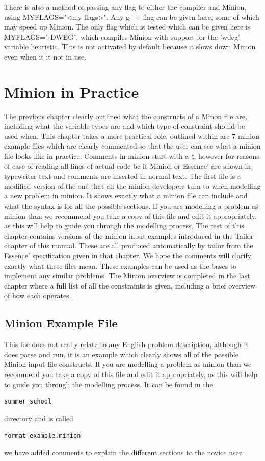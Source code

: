 \documentclass[oneside]{book}
\begin{document}
There is also a method of passing any flag to either the compiler and Minion, using MYFLAGS="<my flags>". Any g++ flag can be given here, some of which may speed up Minion. The only flag which is tested which can be given here is MYFLAGS="-DWEG", which compiles Minion with support for the 'wdeg' variable heuristic. This is not activated by default because it slows down Minion even when it it not in use.





\chapter{Minion in Practice}
The previous chapter clearly outlined what the constructs of a Minon file are, including what the variable types are and which type of constraint should be used when. This chapter takes a more practical role, outlined within are 7 minion example files which are clearly commented so that the user can see what a minion file looks like in practice. Comments in minion start with a $\sharp$, however for reasons of ease of reading all lines of actual code be it Minion or Essence' are shown in typewriter text and comments are inserted in normal text. The first file is a modified version of the one that all the minion developers turn to when modelling a new problem in minion. It shows exactly what a minion file can include and what the syntax is for all the possible sections. If you are modelling a problem as minion than we recommend you take a copy of this file and edit it appropriately, as this will help to guide you through the modelling process. The rest of this chapter contains versions  of the minion input examples introduced in the Tailor chapter of this manual. These are all produced automatically by tailor from the Essence' specification given in that chapter. We hope the comments will clarify exactly what these files mean. These examples can be used as the bases to implement any similar problems. The Minion overview is completed in the last chapter where a full list of all the constraints is given, including a brief overview of how each operates. 

\section{Minion Example File}
This file does not really relate to any English problem description, although it does parse and run,  it is an example which clearly shows all of the possible Minion input file constructs. If you are modelling a problem as minion than we recommend you take a copy of this file and edit it appropriately, as this will help to guide you through the modelling process. It can be found in the \begin{verbatim}summer_school\end{verbatim} directory and is called \begin{verbatim}format_example.minion\end{verbatim} we have added comments  to explain the different sections to the novice user. 
\end{document}
